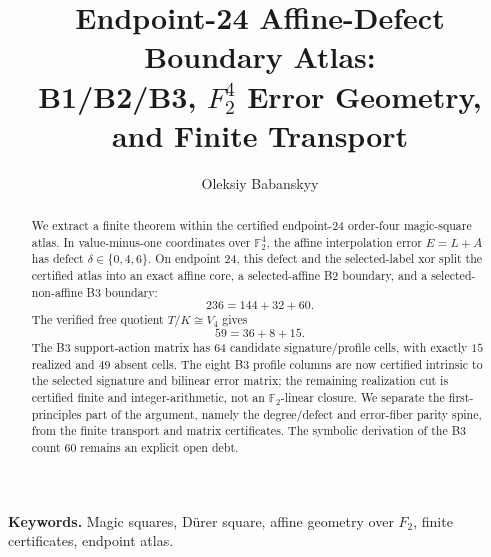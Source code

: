 \documentclass[11pt,a4paper]{article}
\title{Endpoint-24 Affine-Defect Boundary Atlas:\\
B1/B2/B3, \(F_2^4\) Error Geometry, and Finite Transport}
\author{Oleksiy Babanskyy}
\date{}
\theoremstyle{definition}
\theoremstyle{remark}
\newcommand{\F}{\mathbb F}
\newcommand{\TK}{T/K}
\newcommand{\Durer}{D\"urer\xspace}
\begin{document}
\maketitle

\begin{abstract}
We extract a finite theorem within the certified endpoint-24
order-four magic-square atlas.  In value-minus-one coordinates over \(\F_2^4\), the affine
interpolation error \(E=L+A\) has defect \(\delta\in\{0,4,6\}\).  On endpoint
\(24\), this defect and the selected-label xor split the certified atlas into
an exact affine core, a selected-affine B2 boundary, and a selected-non-affine
B3 boundary:
\[
  236=144+32+60.
\]
The verified free quotient \(\TK\cong V_4\) gives
\[
  59=36+8+15.
\]
The B3 support-action matrix has \(64\) candidate signature/profile cells,
with exactly \(15\) realized and \(49\) absent cells.  The eight B3 profile
columns are now certified intrinsic to the selected signature and bilinear error
matrix; the remaining realization cut is certified finite and integer-arithmetic,
not an \(\F_2\)-linear closure.  We separate the first-principles part of the
argument, namely the degree/defect and error-fiber parity spine, from the finite
transport and matrix certificates.  The symbolic derivation of the B3 count
\(60\) remains an explicit open debt.
\end{abstract}

\noindent\textbf{Keywords.} Magic squares, \Durer square, affine geometry over
\(F_2\), finite certificates, endpoint atlas.





\FloatBarrier


\FloatBarrier



\end{document}
